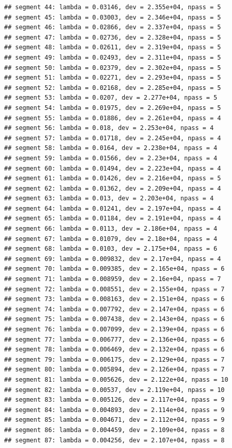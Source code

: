 \documentclass[
]{article}
\begin{document}
\begin{verbatim}
## segment 44: lambda = 0.03146, dev = 2.355e+04, npass = 5
## segment 45: lambda = 0.03003, dev = 2.346e+04, npass = 5
## segment 46: lambda = 0.02866, dev = 2.337e+04, npass = 5
## segment 47: lambda = 0.02736, dev = 2.328e+04, npass = 5
## segment 48: lambda = 0.02611, dev = 2.319e+04, npass = 5
## segment 49: lambda = 0.02493, dev = 2.311e+04, npass = 5
## segment 50: lambda = 0.02379, dev = 2.302e+04, npass = 5
## segment 51: lambda = 0.02271, dev = 2.293e+04, npass = 5
## segment 52: lambda = 0.02168, dev = 2.285e+04, npass = 5
## segment 53: lambda = 0.0207, dev = 2.277e+04, npass = 5
## segment 54: lambda = 0.01975, dev = 2.269e+04, npass = 5
## segment 55: lambda = 0.01886, dev = 2.261e+04, npass = 4
## segment 56: lambda = 0.018, dev = 2.253e+04, npass = 4
## segment 57: lambda = 0.01718, dev = 2.245e+04, npass = 4
## segment 58: lambda = 0.0164, dev = 2.238e+04, npass = 4
## segment 59: lambda = 0.01566, dev = 2.23e+04, npass = 4
## segment 60: lambda = 0.01494, dev = 2.223e+04, npass = 4
## segment 61: lambda = 0.01426, dev = 2.216e+04, npass = 5
## segment 62: lambda = 0.01362, dev = 2.209e+04, npass = 4
## segment 63: lambda = 0.013, dev = 2.203e+04, npass = 4
## segment 64: lambda = 0.01241, dev = 2.197e+04, npass = 4
## segment 65: lambda = 0.01184, dev = 2.191e+04, npass = 4
## segment 66: lambda = 0.0113, dev = 2.186e+04, npass = 4
## segment 67: lambda = 0.01079, dev = 2.18e+04, npass = 4
## segment 68: lambda = 0.0103, dev = 2.175e+04, npass = 6
## segment 69: lambda = 0.009832, dev = 2.17e+04, npass = 4
## segment 70: lambda = 0.009385, dev = 2.165e+04, npass = 6
## segment 71: lambda = 0.008959, dev = 2.16e+04, npass = 7
## segment 72: lambda = 0.008551, dev = 2.155e+04, npass = 7
## segment 73: lambda = 0.008163, dev = 2.151e+04, npass = 6
## segment 74: lambda = 0.007792, dev = 2.147e+04, npass = 6
## segment 75: lambda = 0.007438, dev = 2.143e+04, npass = 6
## segment 76: lambda = 0.007099, dev = 2.139e+04, npass = 6
## segment 77: lambda = 0.006777, dev = 2.136e+04, npass = 6
## segment 78: lambda = 0.006469, dev = 2.132e+04, npass = 6
## segment 79: lambda = 0.006175, dev = 2.129e+04, npass = 7
## segment 80: lambda = 0.005894, dev = 2.126e+04, npass = 7
## segment 81: lambda = 0.005626, dev = 2.122e+04, npass = 10
## segment 82: lambda = 0.00537, dev = 2.119e+04, npass = 10
## segment 83: lambda = 0.005126, dev = 2.117e+04, npass = 9
## segment 84: lambda = 0.004893, dev = 2.114e+04, npass = 9
## segment 85: lambda = 0.004671, dev = 2.112e+04, npass = 9
## segment 86: lambda = 0.004459, dev = 2.109e+04, npass = 8
## segment 87: lambda = 0.004256, dev = 2.107e+04, npass = 8

\end{verbatim}
\end{document}

